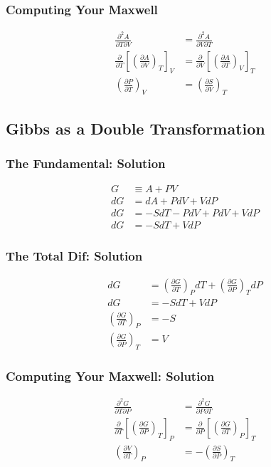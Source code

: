 \documentclass{article}
\newcommand{\be}{\begin{equation}}
\newcommand{\ee}{\end{equation}}
\begin{document}
\subsubsection{Computing Your Maxwell}
\be
\begin{split}
\frac{\partial ^2 A}{\partial T \partial V} &= \frac{\partial ^2 A}{\partial V \partial T} \\
\frac{\partial }{\partial T}\left[\left(\frac{\partial A}{\partial V}\right)_T\right]_V &= \frac{\partial}{\partial V}\left[\left(\frac{\partial A }{\partial T}\right)_V\right]_T \\
\left(\frac{\partial P}{\partial T}\right)_V &= \left(\frac{\partial S}{\partial V}\right)_T
\end{split}
\ee

\subsection{Gibbs as a Double Transformation}

\subsubsection{The Fundamental: Solution}
\be
\begin{split}
G &\equiv A + PV \\
dG &= dA + PdV + VdP \\
dG &= -SdT -PdV + PdV + VdP\\
dG &= -SdT + VdP
\end{split}
\ee

\subsubsection{The Total Dif: Solution}
\be
\begin{split}
    dG &= \left( \frac{\partial G}{\partial T} \right)_PdT + \left( \frac{\partial G}{\partial P}  \right)_T dP\\
     dG &= -SdT + VdP \\
    \left( \frac{\partial G}{\partial T} \right)_P &= -S \\
    \left( \frac{\partial G}{\partial P}  \right)_T &= V
\end{split}
\ee

\subsubsection{Computing Your Maxwell: Solution}
\begin{equation}
\begin{split}
\frac{\partial ^2 G}{\partial T \partial P} &= \frac{\partial ^2 G}{\partial P \partial T} \\
\frac{\partial }{\partial T}\left[\left(\frac{\partial G}{\partial P}\right)_T\right]_P &= \frac{\partial}{\partial P}\left[\left(\frac{\partial G }{\partial T}\right)_P\right]_T \\
\left(\frac{\partial V}{\partial T}\right)_P &= -\left(\frac{\partial S}{\partial P}\right)_T
\end{split}
\end{equation}
\end{document}
